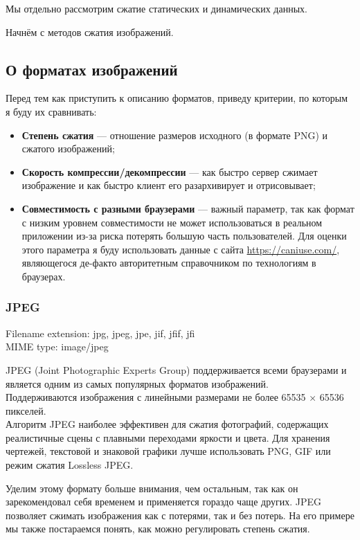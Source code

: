 \documentclass[12pt]{article}
\begin{document}
Мы отдельно рассмотрим сжатие статических и динамических данных.

Начнём с методов сжатия изображений.

\subsection{О форматах изображений}

Перед тем как приступить к описанию форматов, приведу критерии, по которым я буду их сравнивать:

\begin{itemize}
    \item \textbf{Степень сжатия} — отношение размеров исходного (в формате PNG) и сжатого изображений;
    \item \textbf{Скорость компрессии/декомпрессии} — как быстро сервер сжимает изображение и как быстро клиент его разархивирует и отрисовывает;
    \item \textbf{Совместимость с разными браузерами} — важный параметр,  
    так как формат с низким уровнем совместимости не может использоваться в реальном приложении  
    из-за риска потерять большую часть пользователей. Для оценки этого параметра  
    я буду использовать данные с сайта \url{https://caniuse.com/}, являющегося де-факто авторитетным справочником  
    по технологиям в браузерах.
\end{itemize}

\subsubsection{JPEG}

Filename extension: jpg, jpeg, jpe, jif, jfif, jfi\\
MIME type: image/jpeg

JPEG (Joint Photographic Experts Group) поддерживается всеми браузерами  
и является одним из самых популярных форматов изображений.\\
Поддерживаются изображения с линейными размерами не более 65535 × 65536 пикселей.\\

Алгоритм JPEG наиболее эффективен для сжатия фотографий, содержащих реалистичные сцены  
с плавными переходами яркости и цвета. Для хранения чертежей, текстовой и знаковой  
графики лучше использовать PNG, GIF  
или режим сжатия Lossless JPEG.

Уделим этому формату больше внимания, чем остальным, так как он зарекомендовал себя временем  
и применяется гораздо чаще других. JPEG позволяет сжимать изображения как с потерями,  
так и без потерь.  
На его примере мы также постараемся понять, как можно регулировать степень сжатия.
\end{document}
